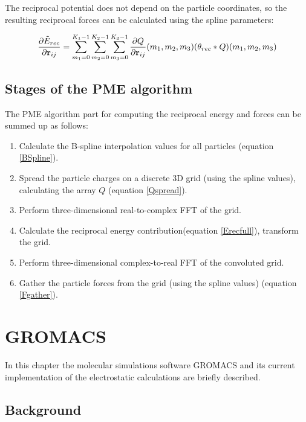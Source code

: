 \documentclass[12pt,a4paper]{report}
\begin{document}
The reciprocal potential does not depend on the particle coordinates, so the resulting reciprocal forces 
can be calculated using the spline parameters:

\begin{equation}  \label{Fgather}
\frac{\partial\tilde{E}_{rec}}{\partial\bold{r}_{ij}} = \sum\limits_{m_1 = 0}^{K_1 -1}\sum\limits_{m_2 = 0}^{K_2 -1}\sum\limits_{m_3 = 0}^{K_3 -1}\frac{\partial Q}{\partial\bold{r}_{ij}}(m_1, m_2, m_3)(\theta_{rec} \ast Q)(m_1, m_2, m_3)
\end{equation}



\section{Stages of the PME algorithm}

The PME algorithm part for computing the reciprocal energy and forces can be summed up as follows:

\begin{enumerate}
\item Calculate the B-spline interpolation values for all particles (equation \eqref{BSpline}).
\item Spread the particle charges on a discrete 3D grid (using the spline values), calculating the array $Q$ (equation \eqref{Qspread}).
\item Perform three-dimensional real-to-complex FFT of the grid.
\item Calculate the reciprocal energy contribution(equation \eqref{Erecfull}), transform the grid.
\item Perform three-dimensional complex-to-real FFT of the convoluted grid.
\item Gather the particle forces from the grid (using the spline values) (equation \eqref{Fgather}).
\end{enumerate}

\newpage
\chapter{GROMACS}

In this chapter the molecular simulations software GROMACS and its current implementation of the electrostatic calculations are briefly described.

\section{Background}
\end{document}
